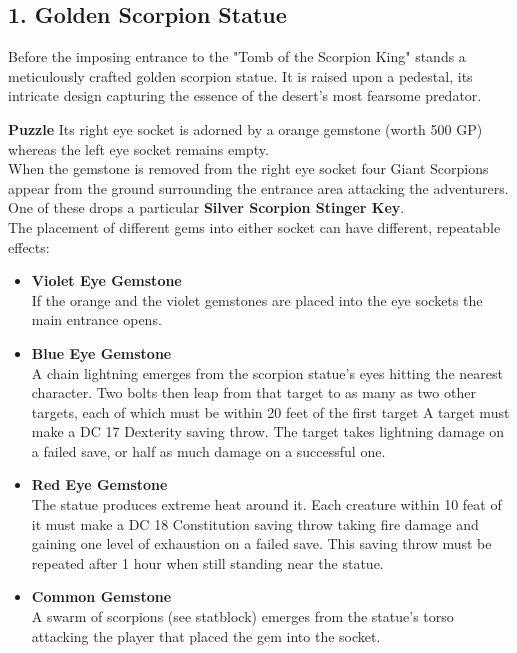 \subsection*{1. Golden Scorpion Statue}
{\entryfont
	Before the imposing entrance to the "Tomb of the Scorpion King" stands a meticulously crafted golden scorpion statue. It is raised upon a pedestal, its intricate design capturing the essence of the desert's most fearsome predator.
	
	\textbf{Puzzle} Its right eye socket is adorned by a orange gemstone (worth 500 GP) whereas the left eye socket remains empty.\\
	When the gemstone is removed from the right eye socket four Giant Scorpions appear from the ground surrounding the entrance area attacking the adventurers. One of these drops a particular \textbf{Silver Scorpion Stinger Key}.\\
	The placement of different gems into either socket can have different, repeatable effects:
	\begin{itemize}
		\item \textbf{Violet Eye Gemstone}\\ If the orange and the violet gemstones are placed into the eye sockets the main entrance opens.
		\item \textbf{Blue Eye Gemstone}\\A chain lightning emerges from the scorpion statue's eyes hitting the nearest character. Two bolts then leap from that target to as many as two other targets, each of which must be within 20 feet of the first target A target must make a DC 17 Dexterity saving throw. The target takes  lightning damage on a failed save, or half as much damage on a successful one.
		\vfill\eject
		\item \textbf{Red Eye Gemstone}\\
		The statue produces extreme heat around it. Each creature within 10 feat of it must make a DC 18 Constitution saving throw taking  fire damage and gaining one level of exhaustion on a failed save. This saving throw must be repeated after 1 hour when still standing near the statue.
		\item \textbf{Common Gemstone}\\
		A swarm of scorpions (see statblock) emerges from the statue's torso attacking the player that placed the gem into the socket.
	\end{itemize}
}


